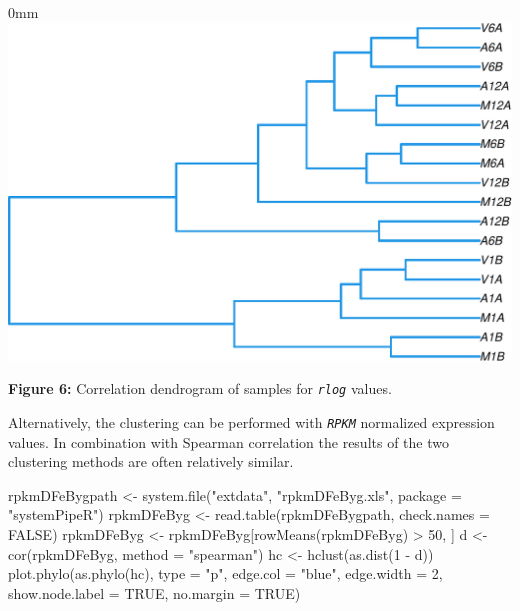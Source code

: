 \documentclass[14pt,]{article}
\newcommand{\hlnum}[1]{\textcolor[rgb]{0.816,0.125,0.439}{#1}}%
\newcommand{\hlstr}[1]{\textcolor[rgb]{0.251,0.627,0.251}{#1}}%
\newcommand{\hlstd}[1]{\textcolor[rgb]{0.251,0.251,0.251}{#1}}%
\newenvironment{Shaded}{\begin{myshaded}}{\end{myshaded}}
\newcommand{\DecValTok}[1]{\hlnum{#1}}
\newcommand{\ConstantTok}[1]{\hlnum{#1}}
\newcommand{\SpecialCharTok}[1]{\hlstr{#1}}
\newcommand{\StringTok}[1]{\hlstr{#1}}
\newcommand{\OtherTok}[1]{{#1}}
\newcommand{\FunctionTok}[1]{\hlstd{#1}}
\newcommand{\AttributeTok}[1]{{#1}}
\newcommand{\NormalTok}[1]{\hlstd{#1}}
\begin{document}
\begin{adjustwidth}{\fltoffset}{0mm}
\includegraphics[width=1\linewidth,]{systemPipeR_files/figure-latex/sample_tree_rlog-1} \end{adjustwidth}

\textbf{Figure 6:} Correlation dendrogram of samples for \emph{\texttt{rlog}} values.

Alternatively, the clustering can be performed with \emph{\texttt{RPKM}} normalized expression values. In combination with Spearman correlation the results of the two clustering methods are often relatively similar.

\begin{Shaded}
\begin{Highlighting}[]
\NormalTok{rpkmDFeBygpath }\OtherTok{\textless{}{-}} \FunctionTok{system.file}\NormalTok{(}\StringTok{"extdata"}\NormalTok{, }\StringTok{"rpkmDFeByg.xls"}\NormalTok{, }\AttributeTok{package =} \StringTok{"systemPipeR"}\NormalTok{)}
\NormalTok{rpkmDFeByg }\OtherTok{\textless{}{-}} \FunctionTok{read.table}\NormalTok{(rpkmDFeBygpath, }\AttributeTok{check.names =} \ConstantTok{FALSE}\NormalTok{)}
\NormalTok{rpkmDFeByg }\OtherTok{\textless{}{-}}\NormalTok{ rpkmDFeByg[}\FunctionTok{rowMeans}\NormalTok{(rpkmDFeByg) }\SpecialCharTok{\textgreater{}} \DecValTok{50}\NormalTok{, ]}
\NormalTok{d }\OtherTok{\textless{}{-}} \FunctionTok{cor}\NormalTok{(rpkmDFeByg, }\AttributeTok{method =} \StringTok{"spearman"}\NormalTok{)}
\NormalTok{hc }\OtherTok{\textless{}{-}} \FunctionTok{hclust}\NormalTok{(}\FunctionTok{as.dist}\NormalTok{(}\DecValTok{1} \SpecialCharTok{{-}}\NormalTok{ d))}
\FunctionTok{plot.phylo}\NormalTok{(}\FunctionTok{as.phylo}\NormalTok{(hc), }\AttributeTok{type =} \StringTok{"p"}\NormalTok{, }\AttributeTok{edge.col =} \StringTok{"blue"}\NormalTok{, }\AttributeTok{edge.width =} \DecValTok{2}\NormalTok{, }\AttributeTok{show.node.label =} \ConstantTok{TRUE}\NormalTok{, }
    \AttributeTok{no.margin =} \ConstantTok{TRUE}\NormalTok{)}
\end{Highlighting}
\end{Shaded}
\end{document}
